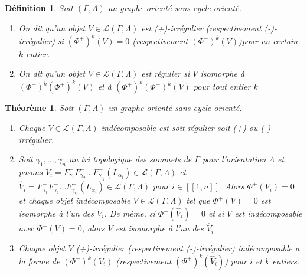 \documentclass[a4paper,10pt]{article}
\newtheorem{thm}{Théorème}[section]
\newtheorem{defi}[]{Définition}[section]
\begin{document}
\begin{defi}
  Soit $(\Gamma,\Lambda)$ un graphe orienté sans cycle orienté. 
  \begin{enumerate}
  \item On dit qu'un objet $V \in \mathscr L(\Gamma,\Lambda)$ est \emph{(+)-irrégulier} (respectivement \emph{(-)-irrégulier}) si $(\Phi^{+})^{k}(V) = 0$ (respectivement $(\Phi^{-})^{k}(V)$)pour un certain $k$ entier.
  \item On dit qu'un objet $V \in \mathscr L(\Gamma,\Lambda)$ est \emph{régulier} si $V$ isomorphe à $(\Phi^{-})^{k}(\Phi^{+})^{k}(V)$ et à $(\Phi^{+})^{k}(\Phi^{-})^{k}(V)$ pour tout entier $k$
  \end{enumerate}
\end{defi}
\begin{thm}
  Soit $(\Gamma,\Lambda)$ un graphe orienté sans cycle orienté.
  \begin{enumerate}
  \item Chaque $V \in \mathscr L(\Gamma,\Lambda)$ indécomposable est soit régulier soit (+) ou (-)-irrégulier.
  \item Soit $\gamma_{1},\dots,\gamma_{n}$ un tri topologique des sommets de $\Gamma$ pour l'orientation $\Lambda$ et posons $V_{i} = F^{-}_{\gamma_{1}}F^{-}_{\gamma_{2}} \dots F^{-}_{\gamma_{i_{1}}}(L_{\alpha_{i}}) \in \mathscr L(\Gamma,\Lambda)$ et  $\widehat V_{i} = F^{-}_{\gamma_{1}}F^{-}_{\gamma_{2}} \dots F^{-}_{\gamma_{i_{1}}}(L_{\alpha_{i}}) \in \mathscr L(\Gamma,\Lambda)$ pour $i \in [\![1,n]\!]$. Alors $\Phi^{+}(V_{i})=0$ et chaque objet indécomposable $V \in \mathscr L(\Gamma,\Lambda)$ tel que $\Phi^{+}(V) =0$ est isomorphe à l'un des $V_{i}$. De même, si $\Phi^{-}(\widehat V_{i}) = 0$ et si $V$ est indécomposable avec $\Phi^{-}(V) = 0$, alors $V$ est isomorphe à l'un des $\widehat V_{i}$.
\item  Chaque objet $V$ (+)-irrégulier (respectivement (-)-irrégulier) indécomposable a la forme de $(\Phi^{-})^{k}(V_{i})$ (respectivement $(\Phi^{+})^{k}(\widehat V_{i})$) pour $i$ et $k$ entiers.
  \end{enumerate}
\end{thm}
\clearpage
\end{document}
